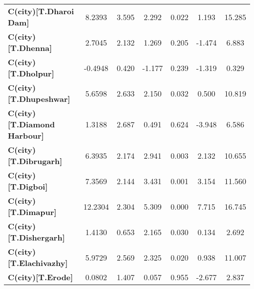 \begin{center}
\begin{tabular}{lcccccc}
\textbf{C(city)[T.Dharoi Dam]}                                                                      &       8.2393  &        3.595     &     2.292  &         0.022        &        1.193    &       15.285     \\
\textbf{C(city)[T.Dhenna]}                                                                          &       2.7045  &        2.132     &     1.269  &         0.205        &       -1.474    &        6.883     \\
\textbf{C(city)[T.Dholpur]}                                                                         &      -0.4948  &        0.420     &    -1.177  &         0.239        &       -1.319    &        0.329     \\
\textbf{C(city)[T.Dhupeshwar]}                                                                      &       5.6598  &        2.633     &     2.150  &         0.032        &        0.500    &       10.819     \\
\textbf{C(city)[T.Diamond Harbour]}                                                                 &       1.3188  &        2.687     &     0.491  &         0.624        &       -3.948    &        6.586     \\
\textbf{C(city)[T.Dibrugarh]}                                                                       &       6.3935  &        2.174     &     2.941  &         0.003        &        2.132    &       10.655     \\
\textbf{C(city)[T.Digboi]}                                                                          &       7.3569  &        2.144     &     3.431  &         0.001        &        3.154    &       11.560     \\
\textbf{C(city)[T.Dimapur]}                                                                         &      12.2304  &        2.304     &     5.309  &         0.000        &        7.715    &       16.745     \\
\textbf{C(city)[T.Dishergarh]}                                                                      &       1.4130  &        0.653     &     2.165  &         0.030        &        0.134    &        2.692     \\
\textbf{C(city)[T.Elachivazhy]}                                                                     &       5.9729  &        2.569     &     2.325  &         0.020        &        0.938    &       11.007     \\
\textbf{C(city)[T.Erode]}                                                                           &       0.0802  &        1.407     &     0.057  &         0.955        &       -2.677    &        2.837     \\

\end{tabular}
\end{center}

